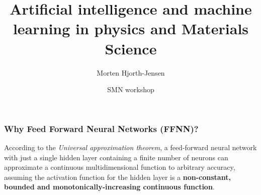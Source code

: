 \documentclass{beamer}
\begin{document}
\title{Artificial intelligence and machine learning in physics and Materials Science}



\author{Morten Hjorth-Jensen}
\date{SMN workshop}

\begin{frame}
\titlepage
\end{frame}



\begin{frame}
\frametitle{Why Feed Forward Neural Networks (FFNN)?}

According to the \emph{Universal approximation theorem}, a feed-forward
neural network with just a single hidden layer containing a finite
number of neurons can approximate a continuous multidimensional
function to arbitrary accuracy, assuming the activation function for
the hidden layer is a \textbf{non-constant, bounded and
monotonically-increasing continuous function}.
\end{frame}
\end{document}

